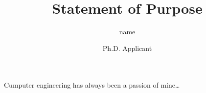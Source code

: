 \documentclass{article}
\title{Statement of Purpose}
\author{name}
\date{Ph.D. Applicant}
\begin{document}
  \maketitle%
  \vspace{20}

  Cumputer engineering has always been a passion of mine\ldots
\end{document}
